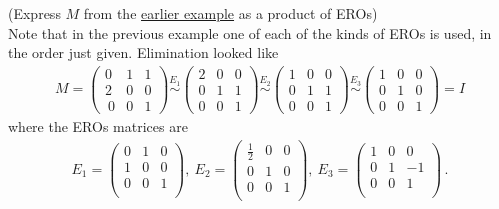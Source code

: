 \begin{example} (Express $M$ from the  
\hyperlink{undo a matrix}{earlier example} as a product of EROs)\\
Note that in the previous example 
one of each of the kinds of EROs is used, in the order just given.
Elimination looked like 
\begin{eqnarray*}
M=
\left(\begin{array}{ccc}
0 & 1 & 1 \\ 
2 & 0 & 0 \\\
0& 0 & 1  
\end{array}  \right)
\stackrel{E_1}{\sim}
\left(\begin{array}{ccc}
2 & 0 & 0 \\
0 & 1 & 1 \\ 
0& 0 & 1  
\end{array}  \right)
\stackrel{E_2}{\sim}
\left(\begin{array}{ccc}
1 & 0 & 0 \\
0 & 1 & 1 \\ 
0& 0 & 1  
\end{array}  \right)
\stackrel{E_3}{\sim}
\left(\begin{array}{ccc}
1 & 0 & 0 \\
0 & 1 & 0 \\ 
0& 0 & 1  
\end{array}  \right)
=I
\end{eqnarray*}
where the EROs matrices are 
\begin{eqnarray*}
E_1
= \left(\begin{array}{ccc}
0  &1 &0\\
1  &0 &0\\ 
0  &0 &1\\
\end{array}  \right)
,~
E_2
= \left(\begin{array}{ccc}
\frac12  &0 &0\\
0  &1 &0\\ 
0  &0 &1\\
\end{array}  \right) , ~
E_3
= \left(\begin{array}{ccc}
1  &0 &0\\
0  &1 & -1\\ 
0  &0 &1\\
\end{array}  \right) \,.
\end{eqnarray*}

\end{example}
